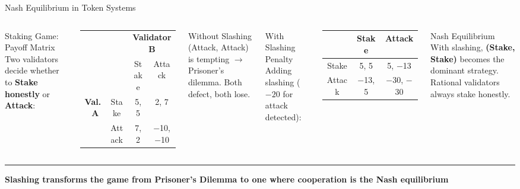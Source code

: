 \documentclass[8pt,aspectratio=169]{beamer}
\newcommand{\bottomnote}[1]{\vfill\vspace{-2mm}\textcolor{mllavender2}{\rule{\textwidth}{0.4pt}}\vspace{1mm}\footnotesize\textbf{#1}}
\begin{document}
\begin{frame}{Nash Equilibrium in Token Systems}
\begin{columns}[T]
\begin{block}{Staking Game: Payoff Matrix}
\footnotesize
Two validators decide whether to \textbf{Stake honestly} or \textbf{Attack}:
\end{block}
\vspace{1mm}
\footnotesize
\begin{tabular}{cc|c|c|}
  & \multicolumn{1}{c}{} & \multicolumn{2}{c}{\textbf{Validator B}} \\
  & & Stake & Attack \\
\cline{3-4}
\multirow{2}{*}{\textbf{Val.~A}} & Stake & \cellcolor{mlgreen!20} 5, 5 & \cellcolor{mlorange!20} 2, 7 \\
\cline{3-4}
  & Attack & \cellcolor{mlorange!20} 7, 2 & \cellcolor{mlred!20} $-$10, $-$10 \\
\cline{3-4}
\end{tabular}
\vspace{2mm}
\begin{alertblock}{\footnotesize Without Slashing}
\footnotesize
(Attack, Attack) is tempting $\rightarrow$ Prisoner's dilemma. Both defect, both lose.
\end{alertblock}

\begin{block}{With Slashing Penalty}
\footnotesize
Adding slashing ($-20$ for attack detected):
\end{block}
\vspace{1mm}
\footnotesize
\begin{tabular}{c|c|c|}
  & Stake & Attack \\
\hline
Stake & \cellcolor{mlgreen!20} 5, 5 & \cellcolor{mlgreen!20} 5, $-$13 \\
\hline
Attack & \cellcolor{mlgreen!20} $-$13, 5 & \cellcolor{mlred!20} $-$30, $-$30 \\
\hline
\end{tabular}
\vspace{2mm}
\begin{exampleblock}{\footnotesize Nash Equilibrium}
\footnotesize
With slashing, \textbf{(Stake, Stake)} becomes the dominant strategy. Rational validators always stake honestly.
\end{exampleblock}
\end{columns}
\bottomnote{Slashing transforms the game from Prisoner's Dilemma to one where cooperation is the Nash equilibrium}
\end{frame}
\end{document}
